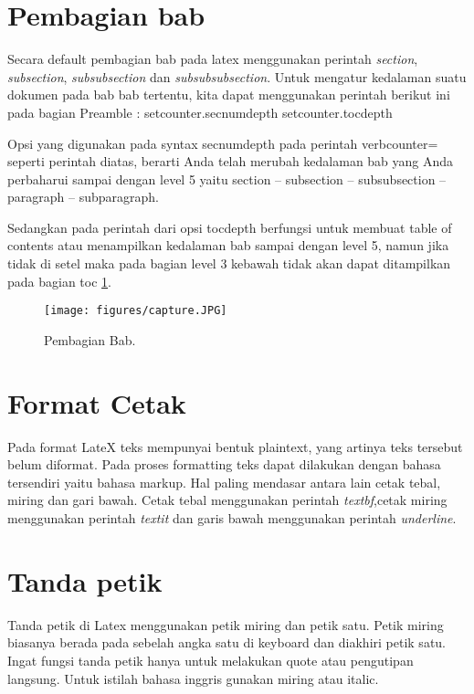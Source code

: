 \section{Pembagian bab}
Secara default pembagian bab pada latex menggunakan perintah \textit{section}, \textit{subsection}, \textit{subsubsection} dan \textit{subsubsubsection}. Untuk mengatur kedalaman suatu dokumen pada bab bab tertentu, kita dapat menggunakan perintah berikut ini pada bagian Preamble :
setcounter.secnumdepth
setcounter.tocdepth



Opsi yang digunakan pada syntax secnumdepth pada perintah verbcounter= seperti perintah diatas, berarti Anda telah merubah kedalaman bab yang Anda perbaharui sampai dengan level 5 yaitu section -- subsection -- subsubsection -- paragraph -- subparagraph. 

Sedangkan pada perintah dari opsi tocdepth berfungsi untuk membuat table of contents atau menampilkan kedalaman bab sampai dengan level 5, namun jika tidak di setel maka pada bagian level 3 kebawah tidak akan dapat ditampilkan pada bagian toc \ref{labelgambar}.


\begin{figure}[ht]
\centerline{\texttt{[image: figures/capture.JPG]}}
\caption{Pembagian Bab.}
\label{labelgambar}
\end{figure}


\section{Format Cetak}
Pada format LateX teks mempunyai bentuk plaintext, yang artinya teks tersebut belum diformat. Pada proses formatting teks dapat dilakukan dengan bahasa tersendiri yaitu bahasa markup. Hal paling mendasar antara lain cetak tebal, miring dan gari bawah. Cetak tebal menggunakan perintah \textit{textbf},cetak miring menggunakan perintah \textit{textit} dan garis bawah menggunakan perintah \textit{underline}.

\section{Tanda petik}
Tanda petik di Latex menggunakan petik miring dan petik satu. Petik miring biasanya berada pada sebelah angka satu di keyboard dan diakhiri petik satu. Ingat fungsi tanda petik hanya untuk melakukan quote atau pengutipan langsung. Untuk istilah bahasa inggris gunakan miring atau italic.


